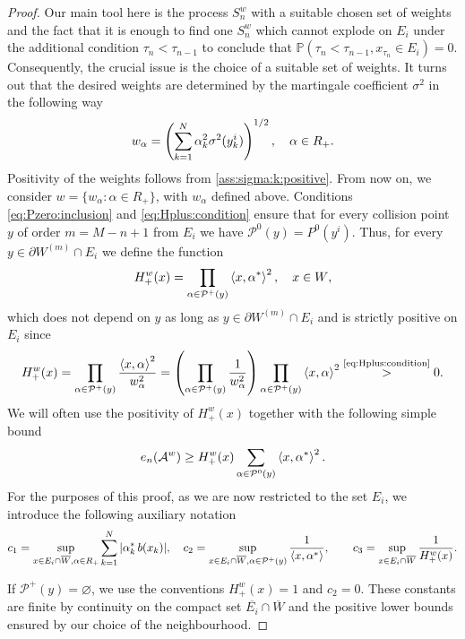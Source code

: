 \documentclass{article}
\numberwithin{equation}{section}
\newcommand{\pr}{\mathbb{P}}
\newcommand{\C}{W}
\newcommand{\Cc}{\overline{W}}
\newcommand{\Cbm}{\partial \C^{(m)}}
\newcommand{\Aa}{\mathcal{A}^{w}}
\newcommand{\xa}{\left<x,\alpha\right>}
\newcommand{\xas}{\left<x,\alpha^*\right>}
\newcommand{\aR}{\alpha\in R_+}
\newcommand{\eA}[1]{e_{#1}(\Aa)}
\newcommand{\Pzero}{\mathcal{P}^0(y)}
\newcommand{\Pplus}{\mathcal{P}^+(y)}
\theoremstyle{plain}
\begin{document}
\begin{proof}
		Our main tool here is the process $S_n^w$ with a suitable chosen set of weights and the fact that it is enough to find one $S_n^w$ which cannot explode on $E_i$ under the additional condition $\tau_{n}<\tau_{n-1}$ to conclude that $\pr(\tau_{n}<\tau_{n-1},x_{\tau_n} \in E_i)=0$. Consequently, the crucial issue is the choice of a suitable set of weights. It turns out that the desired weights are determined by the martingale coefficient $\sigma^2$ in the following way
        \begin{align}
            \label{eq:weights}
            w_\alpha = \left(\sum_{k=1}^N \alpha_k^2\sigma^2(y^i_k)\right)^{1/2}\/,\quad \alpha\in R_+\/.
        \end{align}
		  Positivity of the weights follows from \ref{ass:sigma:k:positive}. From now on, we consider $w=\{w_\alpha: \alpha\in R_+\}$, with $w_\alpha$ defined above. Conditions \ref{eq:Pzero:inclusion} and \ref{eq:Hplus:condition} ensure that for every collision point $y$ of order $m=M-n+1$ from $E_i$ we have $\Pzero = P^0(y^i)$. 
        Thus, for every $y\in \Cbm\cap E_i$ we define the function
		\begin{equation*}
			H_+^w(x) = \prod_{\alpha\in \Pplus} \xas^2\/,\quad x\in \C\/,
		\end{equation*}
		which does not depend on $y$ as long as $y\in \Cbm\cap E_i$ and is strictly positive on $E_i$ since 
		\begin{equation*}
			H_+^w(x) = \prod_{\alpha\in \Pplus}\frac{\xa^2}{w_\alpha^2} = \left(\prod_{\alpha\in \Pplus}\frac{1}{w_\alpha^2}\right) \prod_{\alpha\in \Pplus}\xa^2\/\stackrel{\text{\ref{eq:Hplus:condition}}}{>}0.
		\end{equation*}
		We will often use the positivity of $H^w_+(x)$ together with the following simple bound
    \begin{equation}
    \label{eq:ineq_en_K}
        \eA{n} \geq  H^w_+(x) \sum_{\alpha\in \Pzero} \xas^2 \/. 
    \end{equation}
	For the purposes of this proof, as we are now restricted to the set $E_i$, we introduce the following auxiliary notation
    \begin{equation*}
	c_1 = \sup_{x\in E_i\cap\Cc, \aR}\sum_{k=1}^N |\alpha_k^*\, b(x_k)|\/,\quad c_2 = \sup_{x\in E_i\cap\Cc,\alpha\in \Pplus} \frac{1}{\xas}\/,\qquad 
    c_3 = \sup_{x\in E_i\cap\Cc} \frac{1}{H_+^w(x)}\/.
    \end{equation*}

    If $\Pplus=\varnothing$, we use the conventions $H_+^w(x)=1$ and $c_2=0$. These constants are finite by continuity on the compact set $\overline{E_i}\cap\Cc$ and the positive lower bounds ensured by our choice of the neighbourhood.


\end{proof}
\end{document}
